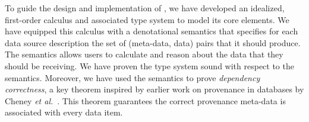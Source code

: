 

To guide the design and implementation of \padsd{}, we have developed
an idealized, first-order calculus and associated type system to model
its core elements.  We have equipped this calculus with a denotational
semantics that specifies for each data source description the set of
(meta-data, data) pairs that it should produce. 
The semantics allows users to calculate and reason about the data that
they should be receiving.
We have
proven the type system sound with respect to the semantics.
Moreover, we have used the
semantics to prove {\em dependency correctness}, a key theorem
inspired by earlier work on provenance in databases by 
Cheney {\em et al.}~\cite{cheney-dbpl07}.  This theorem
guarantees the correct provenance meta-data is associated with
every data item.  

